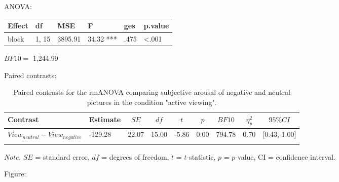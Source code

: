 \documentclass[
  english,
  man,floatsintext]{apa6}
\begin{document}
ANOVA:

\begin{tabular}{l|l|l|l|l|l}
\hline
Effect & df & MSE & F & ges & p.value\\
\hline
block & 1, 15 & 3895.91 & 34.32 *** & .475 & <.001\\
\hline
\end{tabular}

\(BF10=\) 1,244.99

Paired contrasts:

\begin{table}[H]

\begin{center}
\begin{threeparttable}

\caption{\label{tab:unnamed-chunk-3}Paired contrasts for the rmANOVA comparing subjective arousal of negative and neutral pictures in the condition "active viewing".}

\begin{tabular}{lllllllll}
\toprule
Contrast & \multicolumn{1}{c}{Estimate} & \multicolumn{1}{c}{$SE$} & \multicolumn{1}{c}{$df$} & \multicolumn{1}{c}{$t$} & \multicolumn{1}{c}{$p$} & \multicolumn{1}{c}{$BF10$} & \multicolumn{1}{c}{$\eta_{p}^{2}$} & \multicolumn{1}{c}{$95\% CI$}\\
\midrule
$View_{neutral} - View_{negative}$ & -129.28 & 22.07 & 15.00 & -5.86 & 0.00 & 794.78 & 0.70 & {}[0.43, 1.00]\\
\bottomrule
\addlinespace
\end{tabular}

\begin{tablenotes}[para]
\normalsize{\textit{Note.} $SE$ = standard error, $df$ = degrees of freedom, $t$ = $t$-statistic, $p$ = $p$-value, CI = confidence interval.}
\end{tablenotes}

\end{threeparttable}
\end{center}

\end{table}

Figure:
\end{document}
